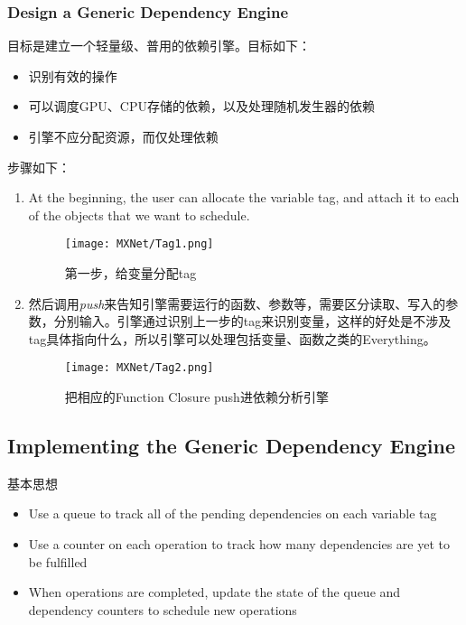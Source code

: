 \subsubsection{Design a Generic Dependency Engine}

目标是建立一个轻量级、普用的依赖引擎。目标如下：
\begin{itemize}
\item 识别有效的操作
\item 可以调度GPU、CPU存储的依赖，以及处理随机发生器的依赖
\item 引擎不应分配资源，而仅处理依赖
\end{itemize}

步骤如下：

\begin{enumerate}
\item At the beginning, the user can allocate the variable tag, and attach it to each of the objects that we want to schedule.

\begin{figure}[!hbtp]
\centering
\texttt{[image: MXNet/Tag1.png]}
\caption{第一步，给变量分配tag}
\label{Tag1}
\end{figure}

\item 然后调用\textit{push}来告知引擎需要运行的函数、参数等，需要区分读取、写入的参数，分别输入。引擎通过识别上一步的tag来识别变量，这样的好处是不涉及tag具体指向什么，所以引擎可以处理包括变量、函数之类的Everything。

\begin{figure}[!hbtp]
\centering
\texttt{[image: MXNet/Tag2.png]}
\caption{把相应的Function Closure push进依赖分析引擎}
\label{Tag2}
\end{figure}
\end{enumerate}

\subsection{Implementing the Generic Dependency Engine}

基本思想
\begin{itemize}
\item Use a queue to track all of the pending dependencies on each variable tag
\item Use a counter on each operation to track how many dependencies are yet to be fulfilled
\item When operations are completed, update the state of the queue and dependency counters to schedule new operations
\end{itemize}

